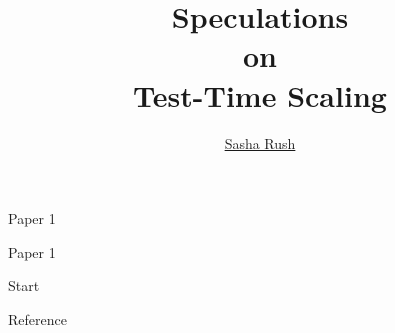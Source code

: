 \documentclass[14pt,aspectratio=169]{beamer}
\title{Speculations \\on\\ Test-Time Scaling}
\author{\underline{Sasha Rush}}
\institute[shortinst]{Cornell Tech, Hugging Face}
\begin{document}
\begin{frame}
	\maketitle
\end{frame}


\begin{frame}{Paper 1}
	\cite{Snell2024-dx}
\end{frame}


\begin{frame}{Paper 1}
	\cite{Snell2024-dx}
\end{frame}


\begin{frame}{Start}

\end{frame}

\begin{frame}{Reference}
	
	
\end{frame}
\end{document}
